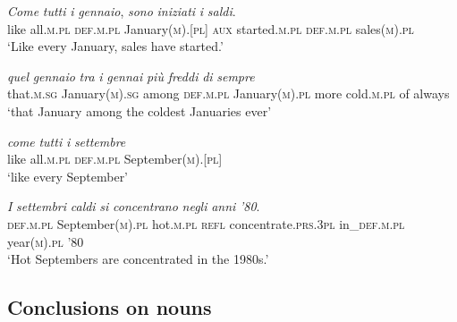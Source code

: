 \documentclass[output=paper,colorlinks,citecolor=brown]{langscibook}
\begin{document}
\begin{exe}
	\ex \label{10ex13}
	\begin{xlist}
		\ex 
		\gll \emph{Come} \emph{tutti} \emph{i} \emph{gennaio}, \emph{sono} \emph{iniziati} \emph{i} \emph{saldi}. \\
		like all.\textsc{m.pl} \textsc{def.m.pl} January(\textsc{m}).[\textsc{pl}] \textsc{aux} started.\textsc{m.pl} \textsc{def.m.pl} sales(\textsc{m}).\textsc{pl} \\
		\trans ‘Like every January, sales have started.’
		
		\ex 
		\gll \emph{quel} \emph{gennaio} \emph{tra} \emph{i} \emph{gennai} \emph{più} \emph{freddi} \emph{di} \emph{sempre} \\
		that.\textsc{m.sg} January(\textsc{m}).\textsc{sg} among \textsc{def.m.pl} January(\textsc{m}).\textsc{pl} more cold.\textsc{m.pl} of always \\
		\trans ‘that January among the coldest Januaries ever’
		
		\ex 
		\gll \emph{come} \emph{tutti} \emph{i} \emph{settembre} \\
		like all.\textsc{m.pl} \textsc{def.m.pl} September(\textsc{m}).[\textsc{pl}] \\
		\trans ‘like every September’
		
		\ex 
		\gll \emph{I} \emph{settembri} \emph{caldi} \emph{si} \emph{concentrano} \emph{negli} \emph{anni} \emph{’80}. \\
		\textsc{def.m.pl} September(\textsc{m}).\textsc{pl} hot.\textsc{m.pl} \textsc{refl} concentrate.\textsc{prs.3pl} in\_\textsc{def.m.pl} year(\textsc{m}).\textsc{pl} ’80 \\
		\trans ‘Hot Septembers are concentrated in the 1980s.’
	\end{xlist}
\end{exe}

\subsection{Conclusions on nouns}
\end{document}
